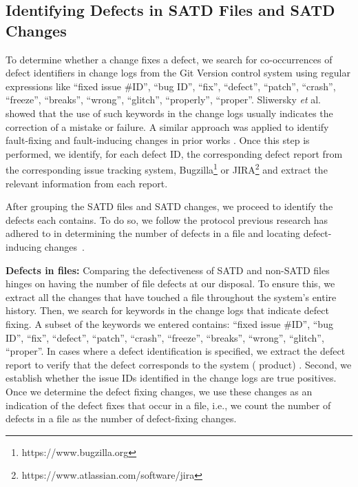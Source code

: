 \subsection{Identifying Defects in SATD Files and SATD Changes}
\label{bugs}
To determine whether a change fixes a defect, we search for co-occurrences of defect identifiers in change logs from the Git Version control system using regular expressions like ``fixed issue \#ID'', ``bug ID'',  ``fix'',  ``defect'',  ``patch'', ``crash'',  ``freeze'', ``breaks'', ``wrong'', ``glitch'', ``properly'', ``proper''.
Sliwersky \textit{et} al. \cite{sliwerski-msr-2005} showed that the use of such keywords in the change logs usually indicates the correction of a mistake or failure.
A similar  approach  was applied  to  identify  fault-fixing  and
fault-inducing  changes in  prior works  \cite{Kamei-tse-2013,Kim-tse-2008, sliwerski-msr-2005}. Once this step is performed, we identify, for each defect ID, the corresponding defect report from
the corresponding issue tracking system, \ie{} Bugzilla\footnote{https://www.bugzilla.org} or JIRA\footnote{https://www.atlassian.com/software/jira} and extract the relevant information from each report.

After grouping the SATD files and SATD changes, we proceed to identify the defects each contains. To do so, we follow the protocol previous research has adhered to in determining the number of defects in a file and locating defect-inducing changes~\cite{Kamei-tse-2013,Kim-tse-2008, sliwerski-msr-2005}.

\noindent\textbf{Defects in files:} Comparing the defectiveness of SATD and non-SATD files hinges on having the number of file defects at our disposal. To ensure this, we extract all the changes that have touched a file throughout the system's entire history. Then, we search for keywords in the change logs that indicate defect fixing. A subset of the keywords we entered contains: ``fixed issue \#ID'', ``bug ID'',  ``fix'',  ``defect'',  ``patch'', ``crash'',  ``freeze'', ``breaks'', ``wrong'', ``glitch'', ``proper''. In cases where a defect identification is specified, we extract the defect report to verify that the defect corresponds to the system (\ie{} product) %
. Second, we establish whether the issue IDs identified in the change logs are true positives. Once we determine the defect fixing changes, we use these changes as an indication of the defect fixes that occur in a file, i.e., we count the number of defects in a file as the number of defect-fixing changes.


